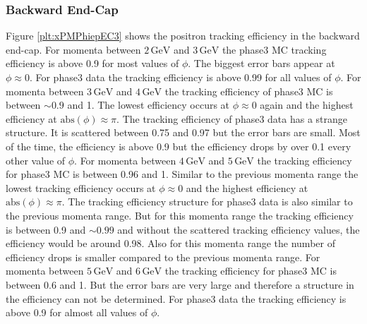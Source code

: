 \documentclass[a4paper,11pt,twosided,final,german,openbib,pdftex,listof=totoc,bibliography=totoc]{scrbook}
\begin{document}
\newpage

\subsubsection{Backward End-Cap}

Figure \ref{plt:xPMPhiepEC3} shows the positron tracking efficiency in the backward end-cap.
For momenta between $2\,\textrm{GeV}$ and $3\,\textrm{GeV}$ the phase3 MC tracking efficiency is above 0.9 for most values of $\phi$. The biggest error bars appear at $\phi \approx 0$. For phase3 data the tracking efficiency is above 0.99 for all values of $\phi$.
For momenta between $3\,\textrm{GeV}$ and $4\,\textrm{GeV}$ the tracking efficiency of phase3 MC is between $\sim 0.9$ and 1. The lowest efficiency occurs at $\phi \approx 0$ again and the highest efficiency at $\textrm{abs}(\phi) \approx \pi$. The tracking efficiency of phase3 data has a strange structure. It is scattered between 0.75 and 0.97 but the error bars are small. Most of the time, the efficiency is above 0.9 but the efficiency drops by over 0.1 every other value of $\phi$.
For momenta between $4\,\textrm{GeV}$ and $5\,\textrm{GeV}$ the tracking efficiency for phase3 MC is between 0.96 and 1. Similar to the previous momenta range the lowest tracking efficiency occurs at  $\phi \approx 0$ and the highest efficiency at $\textrm{abs}(\phi) \approx \pi$. The tracking efficiency structure for phase3 data is also similar to the previous momenta range. But for this momenta range the tracking efficiency is between 0.9 and $\sim 0.99$ and without the scattered tracking efficiency values, the efficiency would be around 0.98. Also for this momenta range the number of efficiency drops is smaller compared to the previous momenta range.
For momenta between $5\,\textrm{GeV}$ and $6\,\textrm{GeV}$ the tracking efficiency for phase3 MC is between 0.6 and 1. But the error bars are very large and therefore a structure in the efficiency can not be determined. For phase3 data the tracking efficiency is above 0.9 for almost all values of $\phi$.
\end{document}
